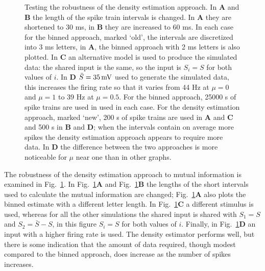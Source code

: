 \documentclass[12pt]{article}
\newcommand{\mV}{\mbox{\,mV}}
\begin{document}
\begin{figure}[tp]
\begin{center}

\end{center}
\caption{Testing the robustness of the density estimation approach. In
  \textbf{A} and \textbf{B} the length of the spike train intervals is
  changed. In \textbf{A} they are shortened to 30 ms, in \textbf{B}
  they are increased to 60 ms. In each case for the binned approach,
  marked \lq{}old\rq{}, the intervals are discretized into 3 ms
  letters, in \textbf{A}, the binned approach with 2 ms letters is
  also plotted. In \textbf{C} an alternative model is used to produce
  the simulated data: the shared input is the same, so the input is
  $S_i=S$ for both values of $i$. In \textbf{D} $\bar{S}=35\mV$ used
  to generate the simulated data, this increases the firing rate so
  that it varies from 44 Hz at $\mu=0$ and $\mu=1$ to 39 Hz at
  $\mu=0.5$. For the binned approach, 25000 s of spike trains are used
  in used in each case.  For the density estimation approach, marked
  \lq{}new\rq{}, 200 s of spike trains are used in \textbf{A} and
  \textbf{C} and 500 s in \textbf{B} and \textbf{D}; when the
  intervals contain on average more spikes the density estimation
  approach appears to require more data. In \textbf{D} the difference
  between the two approaches is more noticeable for $\mu$ near one
  than in other graphs. \label{fig_different_mu_sweeps}}
\end{figure}



The robustness of the density estimation approach to mutual
information is examined in Fig.~\ref{fig_different_mu_sweeps}. In
Fig.~\ref{fig_different_mu_sweeps}\textbf{A} and
Fig.~\ref{fig_different_mu_sweeps}\textbf{B} the lengths of the short intervals
used to calculate the mutual information are changed;
Fig.~\ref{fig_different_mu_sweeps}\textbf{A} also plots the binned
estimate with a different letter length. In
Fig.~\ref{fig_different_mu_sweeps}\textbf{C} a different stimulus is
used, whereas for all the other simulations the
shared input is shared with $S_1=S$ and $S_2=\bar{S}-S$, in this
figure $S_i=S$ for both values of $i$. Finally, in
Fig.~\ref{fig_different_mu_sweeps}\textbf{D} an input with a higher
firing rate is used. The density estimator performs well, but there is
some indication that the amount of data required, though modest
compared to the binned approach, does increase as the number of spikes
increases.
\end{document}
